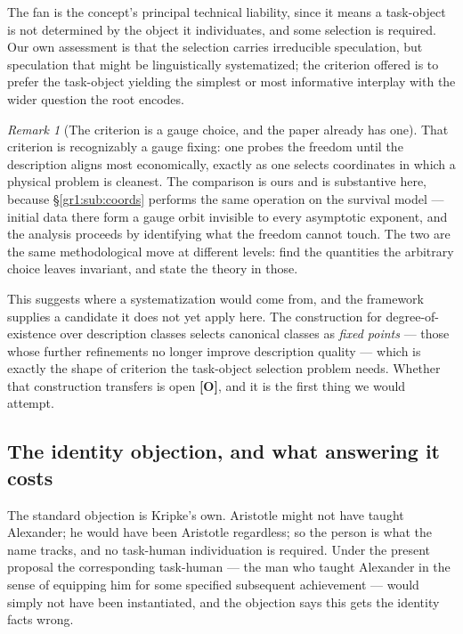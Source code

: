 \documentclass[11pt]{article}
\numberwithin{equation}{section}
\theoremstyle{plain}
\theoremstyle{definition}
\theoremstyle{remark}
\newtheorem{remark}[theorem]{Remark}
\begin{document}
The fan is the concept's principal technical liability, since it means a
task-object is not determined by the object it individuates, and some
selection is required. Our own assessment is that the
selection carries irreducible speculation, but speculation that might be
linguistically systematized; the criterion offered is to prefer the
task-object yielding the simplest or most informative interplay with the
wider question the root encodes.

\begin{remark}[The criterion is a gauge choice, and the paper already
has one]\label{to:rem:gauge}
That criterion is recognizably a gauge fixing: one probes the freedom
until the description aligns most economically, exactly as one selects
coordinates in which a physical problem is cleanest. The comparison is
ours and is substantive here, because
\S\ref{gr1:sub:coords} performs the same operation on the survival
model --- initial data there form a gauge orbit invisible to every
asymptotic exponent, and the analysis proceeds by identifying what the
freedom cannot touch. The two are the same methodological move at
different levels: find the quantities the arbitrary choice leaves
invariant, and state the theory in those.

This suggests where a systematization would come from, and the framework
supplies a candidate it does not yet apply here. The construction for
degree-of-existence over description classes \cite{Aethus} selects
canonical classes as \emph{fixed points} --- those whose further
refinements no longer improve description quality --- which is exactly
the shape of criterion the task-object selection problem needs. Whether
that construction transfers is open \textbf{[O]}, and it is the first
thing we would attempt.
\end{remark}

\subsection{The identity objection, and what answering it costs}
\label{to:sub:identity}

The standard objection is Kripke's own. Aristotle might not have taught
Alexander; he would have been Aristotle regardless; so the person is
what the name tracks, and no task-human individuation is required.
Under the present proposal the corresponding task-human --- the man who
taught Alexander in the sense of equipping him for some specified
subsequent achievement --- would simply not have been instantiated, and
the objection says this gets the identity facts wrong.
\end{document}
